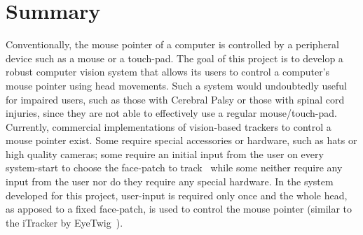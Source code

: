 \section{Summary}
\label{sec:summary}

Conventionally, the mouse pointer of a computer is controlled by a peripheral device such as a mouse or a touch-pad. The goal of this project is to develop a robust computer vision system that allows its users to control a computer's mouse pointer using head movements. Such a system would undoubtedly useful for impaired users, such as those with Cerebral Palsy or those with spinal cord injuries, since they are not able to effectively use a regular mouse/touch-pad. Currently, commercial implementations of vision-based trackers to control a mouse pointer exist. Some require special accessories or hardware, such as hats or high quality cameras; some require an initial input from the user on every system-start to choose the face-patch to track~\cite{bucammouse} while some neither require any input from the user nor do they require any special hardware. In the system developed for this project, user-input is required only once and the whole head, as apposed to a fixed face-patch, is used to control the mouse pointer (similar to the iTracker by EyeTwig~\cite{eyetwig}).


